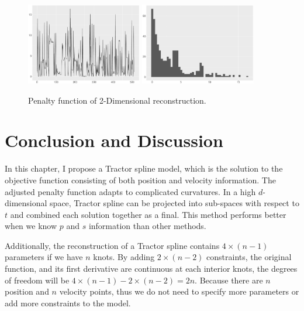 \begin{figure}
  \centering
    \includegraphics[width=0.45\textwidth]{Chapters/02TractorSplineTheory/plot/ggplot/ggRealdataXYPenaltyLine}
    \includegraphics[width=0.45\textwidth]{Chapters/02TractorSplineTheory/plot/ggplot/ggRealdataXYPenaltyHist} 
  \caption{Penalty function of 2-Dimensional reconstruction.}\label{2dpenalty}
\end{figure}


\clearpage

\section{Conclusion and Discussion}

In this chapter, I propose a Tractor spline model, which is the solution to the objective function consisting of both position and velocity information. The adjusted penalty function adapts to complicated curvatures. In a high $d$-dimensional space, Tractor spline can be projected into sub-spaces with respect to $t$ and combined each solution together as a final. This method performs better when we know $p$ and $s$ information than other methods. 

Additionally, the reconstruction of a Tractor spline contains $4\times (n-1)$ parameters if we have $n$ knots. By adding $2\times (n-2)$ constraints, the original function, and its first derivative are continuous at each interior knots, the degrees of freedom will be $4\times (n-1)-2\times (n-2)=2n$. Because there are $n$ position and $n$ velocity points, thus we do not need to specify more parameters or add more constraints to the model. 

